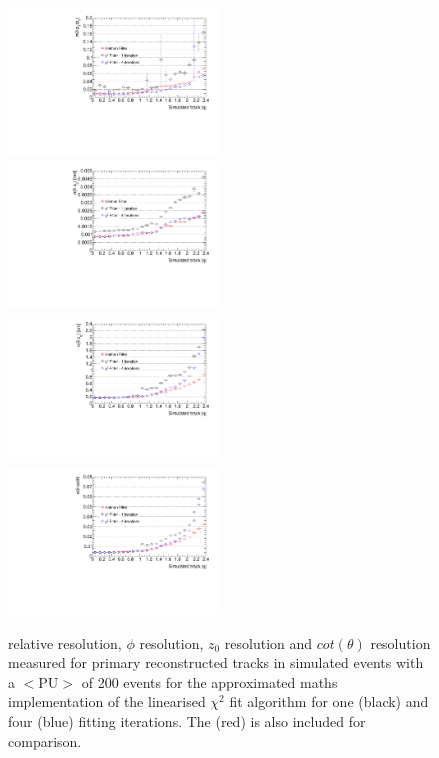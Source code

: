 \begin{figure}[htb]
\centering
\includegraphics[width=0.495\textwidth]{figs/tk-upgrade/results-chi2fitter/ptRelResVsEta_IterationComparison.pdf}
\includegraphics[width=0.495\textwidth]{figs/tk-upgrade/results-chi2fitter/phi0ResVsEta_IterationComparison.pdf}
\\
\includegraphics[width=0.495\textwidth]{figs/tk-upgrade/results-chi2fitter/z0ResVsEta_IterationComparison.pdf}
\includegraphics[width=0.495\textwidth]{figs/tk-upgrade/results-chi2fitter/cotThetaResVsEta_IterationComparison.pdf}
\caption{
\pt relative resolution, $\phi$ resolution, $z_{0}$ resolution and $cot(\theta)$ resolution measured for primary reconstructed tracks in simulated \ttbar events with a $<\textrm{PU}>$ of 200 events for the approximated maths implementation of the linearised $\chi^{2}$ fit algorithm for one (black) and four (blue) fitting iterations. The \KF (red) is also included for comparison.
}
\label{fig:chi2HelixParametersResIterationsComparison}
\end{figure}

